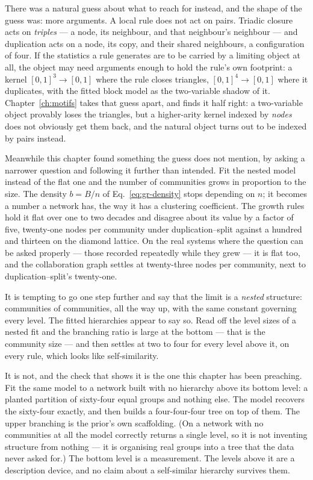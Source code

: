 There was a natural guess about what to reach for instead, and the shape of the
guess was: more arguments. A local rule does not act on pairs. Triadic closure
acts on \emph{triples} --- a node, its neighbour, and that neighbour's neighbour
--- and duplication acts on a node, its copy, and their shared neighbours, a
configuration of four. If the statistics a rule generates are to be carried by a
limiting object at all, the object may need arguments enough to hold the rule's
own footprint: a kernel $[0,1]^3\to[0,1]$ where the rule closes triangles,
$[0,1]^4\to[0,1]$ where it duplicates, with the fitted block model as the
two-variable shadow of it. Chapter~\ref{ch:motifs} takes that guess apart, and
finds it half right: a two-variable object provably loses the triangles, but a
higher-arity kernel indexed by \emph{nodes} does not obviously get them back, and
the natural object turns out to be indexed by pairs instead.

Meanwhile this chapter found something the guess does not mention, by asking a
narrower question and following it further than intended. Fit the nested model
instead of the flat one and the number of communities grows in proportion to the
size. The density $b=B/n$ of Eq.~\eqref{eq:gr-density} stops depending on $n$; it
becomes a number a network has, the way it has a clustering coefficient. The growth rules hold it flat over one to
two decades and disagree about its value by a factor of five, twenty-one nodes
per community under duplication--split against a hundred and thirteen on the
diamond lattice. On
the real systems where the question can be asked properly --- those recorded
repeatedly while they grew --- it is flat too, and the collaboration graph settles
at twenty-three nodes per community, next to duplication--split's twenty-one.

It is tempting to go one step further and say that the limit is a \emph{nested}
structure: communities of communities, all the way up, with the same constant
governing every level. The fitted hierarchies appear to say so. Read off the level
sizes of a nested fit and the branching ratio is large at the bottom --- that is
the community size --- and then settles at two to four for every level above it,
on every rule, which looks like self-similarity.

It is not, and the check that shows it is the one this chapter has been preaching.
Fit the same model to a network built with no hierarchy above its bottom level: a
planted partition of sixty-four equal groups and nothing else. The model recovers
the sixty-four exactly, and then builds a four-four-four tree on top of them. The
upper branching is the prior's own scaffolding. (On a network with no communities
at all the model correctly returns a single level, so it is not inventing
structure from nothing --- it is organising real groups into a tree that the data
never asked for.) The bottom level is a measurement. The levels above it are a
description device, and no claim about a self-similar hierarchy survives them.

